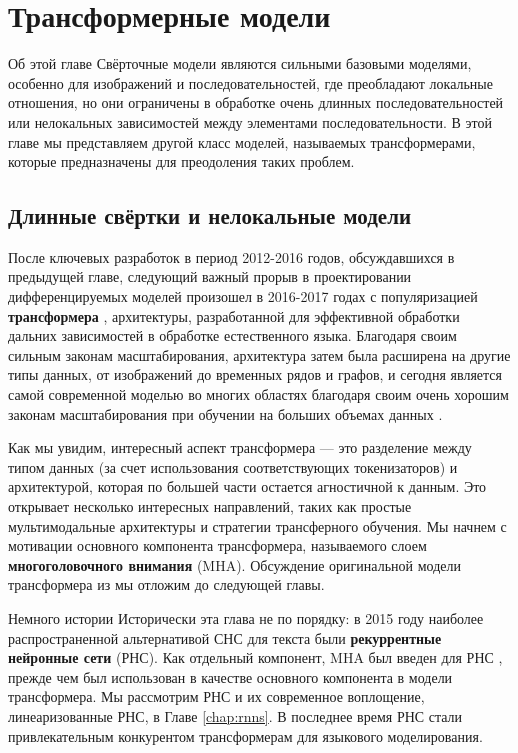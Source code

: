 \chapter{Трансформерные модели}
\label{chap:transformers}

\begin{supportbox}{Об этой главе}
Свёрточные модели являются сильными базовыми моделями, особенно для изображений и последовательностей, где преобладают локальные отношения, но они ограничены в обработке очень длинных последовательностей или нелокальных зависимостей между элементами последовательности. В этой главе мы представляем другой класс моделей, называемых трансформерами, которые предназначены для преодоления таких проблем.
\end{supportbox}

\section{Длинные свёртки и нелокальные модели}

После ключевых разработок в период 2012-2016 годов, обсуждавшихся в предыдущей главе, следующий важный прорыв в проектировании дифференцируемых моделей произошел в 2016-2017 годах с популяризацией \textbf{трансформера} \cite{vaswani2017attention}, архитектуры, разработанной для эффективной обработки дальних зависимостей в обработке естественного языка. Благодаря своим сильным законам масштабирования, архитектура затем была расширена на другие типы данных, от изображений до временных рядов и графов, и сегодня является самой современной моделью во многих областях благодаря своим очень хорошим законам масштабирования при обучении на больших объемах данных \cite{kaplan2020scaling,bordes2024introduction}. 

Как мы увидим, интересный аспект трансформера — это разделение между типом данных (за счет использования соответствующих токенизаторов) и архитектурой, которая по большей части остается агностичной к данным. Это открывает несколько интересных направлений, таких как простые мультимодальные архитектуры и стратегии трансферного обучения. Мы начнем с мотивации основного компонента трансформера, называемого слоем \textbf{многоголовочного внимания} (MHA). Обсуждение оригинальной модели трансформера из \cite{vaswani2017attention} мы отложим до следующей главы.


\begin{supportbox}{Немного истории}
Исторически эта глава не по порядку: в 2015 году наиболее распространенной альтернативой СНС для текста были \textbf{рекуррентные нейронные сети} (РНС). Как отдельный компонент, MHA был введен для РНС \cite{bahdanau2014neural}, прежде чем был использован в качестве основного компонента в модели трансформера. Мы рассмотрим РНС и их современное воплощение, линеаризованные РНС, в Главе \ref{chap:rnns}. В последнее время РНС стали привлекательным конкурентом трансформерам для языкового моделирования.
\end{supportbox}

